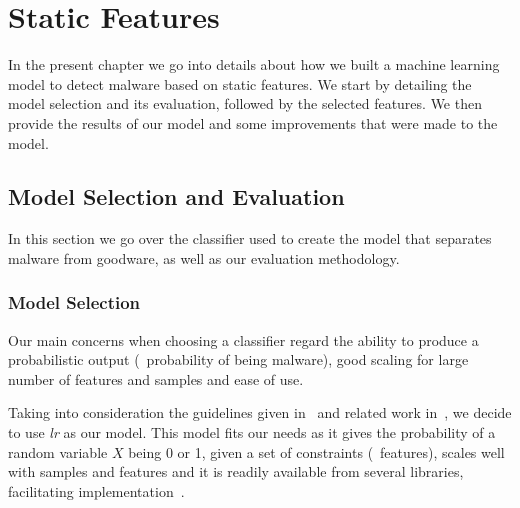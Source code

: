 
\chapter{Static Features}
\label{chapter:static_features}

In the present chapter we go into details about how we built a machine learning model to detect malware based on static features. We start by detailing the model selection and its evaluation, followed by the selected features. We then provide the results of our model and some improvements that were made to the model.

\section{Model Selection and Evaluation}
\label{section:model_selection_evaluation}

In this section we go over the classifier used to create the model that separates malware from goodware, as well as our evaluation methodology.

\subsection{Model Selection}
\label{section:model_selection}

Our main concerns when choosing a classifier regard the ability to produce a probabilistic output (\ie\ probability of being malware), good scaling for large number of features and samples and ease of use.

Taking into consideration the guidelines given in~\cite{rossow:practices,shabtai:survey} and related work in~\cite{miller:rev_int,nissim:al_pdf,rieck:dynamic,schultz:data_mining}, we decide to use \textit{\acrfull{lr}} as our model.
This model fits our needs as it gives the probability of a random variable $X$ being 0 or 1, given a set of constraints (\ie~features), scales well with samples and features and it is readily available from several libraries, facilitating implementation~\cite{friedman2001elements}.

